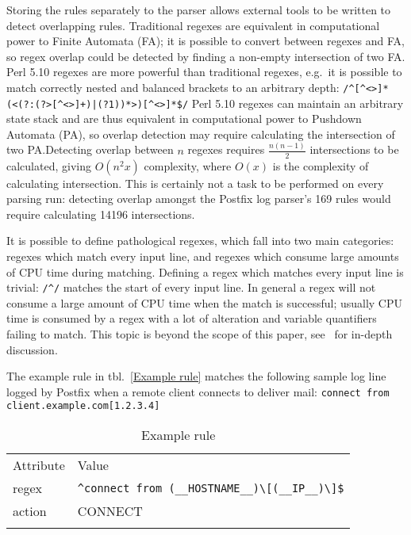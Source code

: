 \documentclass[draft]{svmult}
\newcommand{\tableline}[0]{%
    \noalign{\smallskip}%
    \hline%
    \noalign{\smallskip}%
}
\newcommand{\refwithlabel}[2]{%
    #1~\vref{#2}%
}
\newcommand{\tableref}[1]{%
    \refwithlabel{tbl.}{#1}%
}
\newcommand{\daemon}[1]{%
    \texttt{postfix/#1}%
}
\newcommand{\tab}[0]{%
    \hspace*{2em}%
}
\newcommand{\numberOFrules}[0]{%
    169%
}
\newcommand{\numberOFruleINTERSECTIONS}[0]{%
    14196%
}
\begin{document}
Storing the rules separately to the parser allows external tools to be
written to detect overlapping rules.  Traditional regexes are equivalent in
computational power to Finite Automata (FA); it is possible to convert
between regexes and FA, so regex overlap could be detected by finding a
non-empty intersection of two FA\@.  Perl 5.10 regexes are more powerful
than traditional regexes, e.g.\ it is possible to match correctly nested
and balanced brackets to an arbitrary depth:
\newline{}\tab{}\verb!/^[^<>]*(<(?:(?>[^<>]+)|(?1))*>)[^<>]*$/!\newline{}
Perl 5.10 regexes can maintain an arbitrary state stack and are thus
equivalent in computational power to Pushdown Automata (PA), so overlap
detection may require calculating the intersection of two PA.\@  Detecting
overlap between $n$ regexes requires $\frac{n(n-1)}{2}$ intersections to be
calculated, giving $O(n^2x)$ complexity, where $O(x)$ is the complexity of
calculating intersection.  This is certainly not a task to be performed on
every parsing run: detecting overlap amongst the Postfix log parser's
\numberOFrules{} rules would require calculating
\numberOFruleINTERSECTIONS{} intersections.

It is possible to define pathological regexes, which fall into two main
categories: regexes which match every input line, and regexes which consume
large amounts of CPU time during matching.  Defining a regex which matches
every input line is trivial: \verb!/^/! matches the start of every input
line.  In general a regex will not consume a large amount of CPU time when
the match is successful; usually CPU time is consumed by a regex with a lot
of alteration and variable quantifiers failing to match.  This topic is
beyond the scope of this paper, see~\cite{mastering-regular-expressions}
for in-depth discussion.

\label{example rule}

The example rule in \tableref{Example rule} matches the following sample
log line logged by Postfix when a remote client connects to deliver mail:
\newline{}\tab{}\verb!connect from client.example.com[1.2.3.4]!

\begin{table}[htbp]
    \caption{Example rule}
    \empty{}\label{Example rule}
    \begin{tabular}[]{ll}
        \tableline{}%
        Attribute                 & Value                                            \\
        \tableline{}%
        regex                     & \verb!^connect from (__HOSTNAME__)\[(__IP__)\]$! \\
        action                    & CONNECT                                          \\
        \tableline{}%
    \end{tabular}
\end{table}
\end{document}

